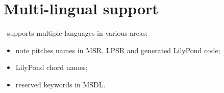 
\chapter{Multi-lingual support}


\mf\ supports multiple languages in various areas:
\begin{itemize}
\item note pitches names in MSR, LPSR and generated LilyPond code;
\item LilyPond chord names;
\item reserved keywords in MSDL.
\end{itemize}
